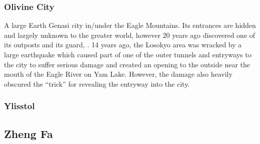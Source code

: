 \subsubsection{Olivine City}
\label{places:olivine}
A large Earth Genasi city in/under the Eagle Mountains. Its entrances are hidden and largely unknown to the greater world, however 20 years ago  discovered one of its outposts and its guard, . 14 years ago, the Losokyo area was wracked by a large earthquake which caused part of one of the outer tunnels and entryways to the city to suffer serious damage and created an opening to the outside near the mouth of the Eagle River on Yam Lake. However, the damage also heavily obscured the ``trick'' for revealing the entryway into the city.

\subsubsection{Ylisstol}
\label{places:ylisstol}

\subsection{Zheng Fa}
\label{nations:zhengfa}